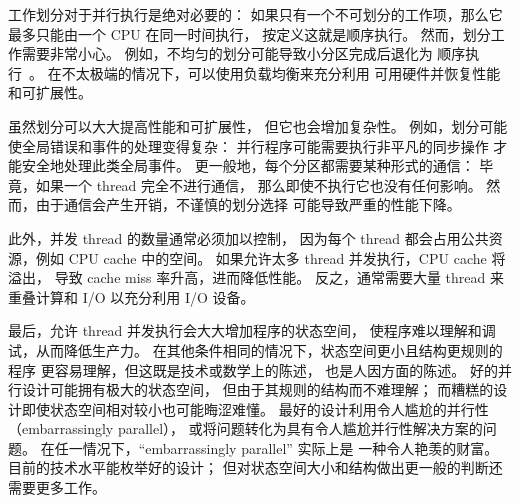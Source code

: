 工作划分对于并行执行是绝对必要的：
如果只有一个不可划分的工作项，那么它最多只能由一个 CPU 在同一时间执行，
按定义这就是顺序执行。
然而，划分工作需要非常小心。
例如，不均匀的划分可能导致小分区完成后退化为
顺序执行~\cite{GeneAmdahl1967AmdahlsLaw}。
在不太极端的情况下，可以使用负载均衡来充分利用
可用硬件并恢复性能和可扩展性。

虽然划分可以大大提高性能和可扩展性，
但它也会增加复杂性。
例如，划分可能使全局错误和事件的处理变得复杂：
并行程序可能需要执行非平凡的同步操作
才能安全地处理此类全局事件。
更一般地，每个分区都需要某种形式的通信：
毕竟，如果一个 thread 完全不进行通信，
那么即使不执行它也没有任何影响。
然而，由于通信会产生开销，不谨慎的划分选择
可能导致严重的性能下降。

此外，并发 thread 的数量通常必须加以控制，
因为每个 thread 都会占用公共资源，例如 CPU cache 中的空间。
如果允许太多 thread 并发执行，CPU cache 将溢出，
导致 cache miss 率升高，进而降低性能。
反之，通常需要大量 thread 来重叠计算和 I/O
以充分利用 I/O 设备。

\QuickQuizEnd

最后，允许 thread 并发执行会大大增加程序的状态空间，
使程序难以理解和调试，从而降低生产力。
在其他条件相同的情况下，状态空间更小且结构更规则的程序
更容易理解，但这既是技术或数学上的陈述，
也是人因方面的陈述。
好的并行设计可能拥有极大的状态空间，
但由于其规则的结构而不难理解；
而糟糕的设计即使状态空间相对较小也可能晦涩难懂。
最好的设计利用令人尴尬的并行性（embarrassingly parallel），
或将问题转化为具有令人尴尬并行性解决方案的问题。
在任一情况下，``embarrassingly parallel'' 实际上是
一种令人艳羡的财富。
目前的技术水平能枚举好的设计；
但对状态空间大小和结构做出更一般的判断还需要更多工作。

